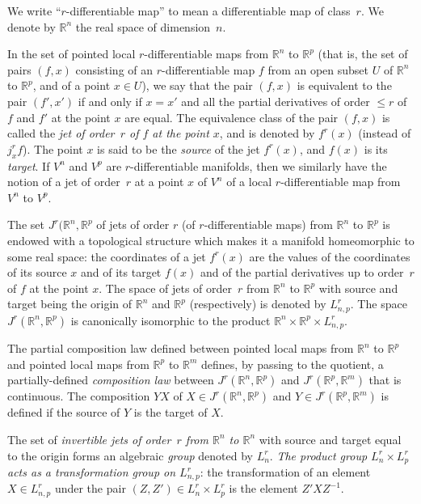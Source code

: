 \documentclass{article}
\theoremstyle{plain}
\theoremstyle{definition}
\newcommand{\RR}{\mathbb{R}}
\renewcommand{\leq}{\leqslant}
\newcommand{\oldpage}[1]{\marginpar{\footnotesize$\Big\vert$ \textit{p.~#1}}}
\begin{document}
We write ``$r$-differentiable map'' to mean a differentiable map of class~$r$.
We denote by $\RR^n$ the real space of dimension~$n$.

In the set of pointed local $r$-differentiable maps from $\RR^n$ to $\RR^p$ (that is, the set of pairs $(f,x)$ consisting of an $r$-differentiable map $f$ from an open subset $U$ of $\RR^n$ to $\RR^p$, and of a point $x\in U$), we say that the pair $(f,x)$ is equivalent to the pair $(f',x')$ if and only if $x=x'$ and all the partial derivatives of order $\leq r$ of $f$ and $f'$ at the point $x$ are equal.
The equivalence class of the pair $(f,x)$ is called the \emph{jet of order~$r$ of $f$ at the point $x$}, and is denoted by $f^r(x)$ (instead of $j_x^rf$).
The point $x$ is said to be the \emph{source} of the jet $f^r(x)$, and $f(x)$ is its \emph{target}.
If $V^n$ and $V^p$ are $r$-differentiable manifolds, then we similarly have the notion of a jet of order~$r$ at a point $x$ of $V^n$ of a local $r$-differentiable map from $V^n$ to $V^p$.

The set $J^r(\RR^n,\RR^p$ of jets of order $r$ (of $r$-differentiable maps) from $\RR^n$ to $\RR^p$ is endowed with a topological structure which makes it a manifold homeomorphic to some real space:
the coordinates of a jet $f^r(x)$ are the values of the coordinates of its source $x$ and of its target $f(x)$ and of the partial derivatives up to order~$r$ of $f$ at the point $x$.
The space of jets of order~$r$ from
\oldpage{7-02}
$\RR^n$ to $\RR^p$ with source and target being the origin of $\RR^n$ and $\RR^p$ (respectively) is denoted by $L_{n,p}^r$.
The space $J^r(\RR^n,\RR^p)$ is canonically isomorphic to the product $\RR^n\times\RR^p\times L_{n,p}^r$.

The partial composition law defined between pointed local maps from $\RR^n$ to $\RR^p$ and pointed local maps from $\RR^p$ to $\RR^m$ defines, by passing to the quotient, a partially-defined \emph{composition law} between $J^r(\RR^n,\RR^p)$ and $J^r(\RR^p,\RR^m)$ that is continuous.
The composition $YX$ of $X\in J^r(\RR^n,\RR^p)$ and $Y\in J^r(\RR^p,\RR^m)$ is defined if the source of $Y$ is the target of $X$.

The set of \emph{invertible jets of order~$r$ from $\RR^n$ to $\RR^n$} with source and target equal to the origin forms an algebraic \emph{group} denoted by $L_n^r$.
\emph{The product group $L_n^r\times L_p^r$ acts as a transformation group on $L_{n,p}^r$}: the transformation of an element $X\in L_{n,p}^r$ under the pair $(Z,Z')\in L_n^r\times L_p^r$ is the element $Z'XZ^{-1}$.
\end{document}
